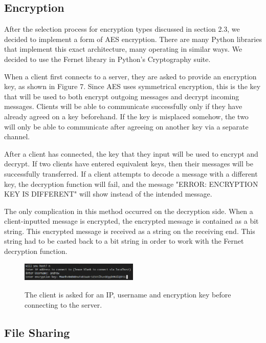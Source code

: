 \documentclass{article}
\begin{document}
\subsection{Encryption}

After the selection process for encryption types discussed in section 2.3, we decided to implement a form of AES encryption. There are many Python libraries that implement this exact architecture, many operating in similar ways. We decided to use the Fernet library in Python's Cryptography suite. 

When a client first connects to a server, they are asked to provide an encryption key, as shown in Figure 7. Since AES uses symmetrical encryption, this is the key that will be used to both encrypt outgoing messages and decrypt incoming messages. Clients will be able to communicate successfully only if they have already agreed on a key beforehand. If the key is misplaced somehow, the two will only be able to communicate after agreeing on another key via a separate channel.

After a client has connected, the key that they input will be used to encrypt and decrypt. If two clients have entered equivalent keys, then their messages will be successfully transferred. If a client attempts to decode a message with a different key, the decryption function will fail, and the message "ERROR: ENCRYPTION KEY IS DIFFERENT" will show instead of the intended message. 

The only complication in this method occurred on the decryption side. When a client-inputted message is encrypted, the encrypted message is contained as a bit string. This encrypted message is received as a string on the receiving end. This string had to be casted back to a bit string in order to work with the Fernet decryption function.

\begin{figure}[h]
\caption{The client is asked for an IP, username and encryption key before connecting to the server.}
\centering
\includegraphics[width=0.5\textwidth]{media/StartCode.PNG}
\label{client3}
\end{figure}

\subsection{File Sharing}
\end{document}
